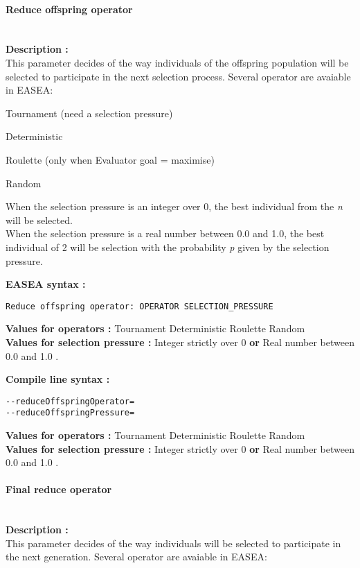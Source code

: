 \documentclass{book}
\begin{document}
\paragraph{Reduce offspring
operator}\label{reduce-offspring-operator}
~\\

\textbf{Description :}\\This parameter decides of the way individuals of
the offspring population will be selected to participate in the next
selection process. Several operator are avaiable in EASEA:

Tournament (need a selection pressure)

Deterministic

Roulette (only when Evaluator goal = maximise)

Random

When the selection pressure is an integer over 0, the best individual
from the \emph{n} will be selected.\\When the selection pressure is a
real number between 0.0 and 1.0, the best individual of 2 will be
selection with the probability \emph{p} given by the selection pressure.

\textbf{EASEA syntax :}

\texttt{Reduce~offspring~operator:~OPERATOR~SELECTION\_PRESSURE}

\textbf{Values for operators :} Tournament Deterministic Roulette
Random\\\textbf{Values for selection pressure :} Integer strictly over 0
\textbf{or} Real number between 0.0 and 1.0 .

\textbf{Compile line syntax :}

\texttt{-{}-reduceOffspringOperator=}\\\texttt{-{}-reduceOffspringPressure=}

\textbf{Values for operators :} Tournament Deterministic Roulette
Random\\\textbf{Values for selection pressure :} Integer strictly over 0
\textbf{or} Real number between 0.0 and 1.0 .

\paragraph{Final reduce operator}\label{final-reduce-operator}
~\\

\textbf{Description :}\\This parameter decides of the way individuals
will be selected to participate in the next generation. Several operator
are avaiable in EASEA:
\end{document}
